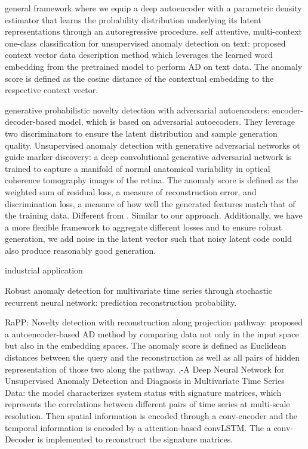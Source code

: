 \documentclass{article}
\begin{document}
	\cite{abati2019latent} general framework where we equip a deep autoencoder with a parametric density estimator that learns the probability distribution underlying its latent representations through an autoregressive procedure.
	\cite{ruff2019self} self attentive, multi-context one-class classification for unsupervised anomaly detection on text: proposed context vector data description method which leverages the learned word embedding from the pretrained model to perform AD on text data. The anomaly score is defined as the cosine distance of the contextual embedding to the respective context vector.
	
	
	\cite{pidhorskyi2018generative} generative probabilistic novelty detection with adversarial autoencoders: encoder-decoder-based model, which is based on adversarial autoecoders. They leverage two discriminators to ensure the latent distribution and sample generation quality. 
	\cite{schlegl2017unsupervised} Unsupervised anomaly detection with generative adversarial networks ot guide marker discovery: a deep convolutional generative adversarial network is trained to capture a manifold of normal anatomical variability in optical coherence tomography images of the retina. The anomaly score is defined as the weighted sum of residual loss, a measure of reconstruction error, and discrimination loss, a measure of how well the generated features match that of the training data. Different from \cite{schlegl2017unsupervised}.
	Similar to our approach. Additionally, we have a more flexible framework to aggregate different losses and to ensure robust generation, we add noise in the latent vector such that noisy latent code could also produce reasonably good generation.
	
	
	industrial application \cite{su2019robust}
	
	\cite{su2019robust} Robust anomaly detection for multivariate time series through stochastic recurrent neural network: prediction reconstruction probability.
	
	\cite{kim2019rapp} RaPP: Novelty detection with reconstruction along projection pathway: proposed a autoencoder-based AD method by comparing data not only in the input space but also in the embedding spaces. The anomaly score is defined as Euclidean distances between the query and the reconstruction as well as all pairs of hidden representation of those two along the pathway.
	\cite{zhang2019deep},-A Deep Neural Network for Unsupervised Anomaly Detection and Diagnosis in Multivariate Time Series Data: the model characterizes system status with signature matrices, which represents the correlations between different pairs of time series at multi-scale resolution. Then spatial information is encoded through a conv-encoder and the temporal information is encoded by a attention-based convLSTM. The a conv-Decoder is implemented to reconstruct the signature matrices.
	
\end{document}
